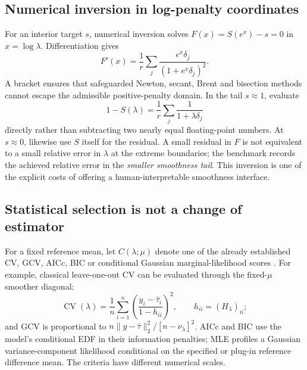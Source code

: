 \subsection{Numerical inversion in log-penalty coordinates}
For an interior target $s$, numerical inversion solves
$F(x)=S(e^x)-s=0$ in $x=\log\lambda$. Differentiation gives
\begin{equation}
F'(x)=\frac{1}{r}\sum_j
\frac{e^x\delta_j}{(1+e^x\delta_j)^2}.
\label{eq:expanded-log-derivative}
\end{equation}
A bracket ensures that safeguarded Newton, secant,
Brent and bisection methods cannot escape the admissible
positive-penalty domain. In the tail $s\approx1$, evaluate
\[
1-S(\lambda)=\frac1r\sum_j
\frac{1}{1+\lambda\delta_j}
\]
directly rather than subtracting two nearly equal
floating-point numbers. At $s\approx0$, likewise use $S$
itself for the residual. A small residual in $F$ is not
equivalent to a small relative error in $\lambda$ at the
extreme boundaries; the benchmark records the achieved
relative error in the \emph{smaller smoothness tail}.
This inversion is one of the explicit costs of offering
a human-interpretable smoothness interface.

\subsection{Statistical selection is not a change of estimator}
For a fixed reference mean, let $C(\lambda;\mu)$ denote
one of the already established CV, GCV, AICc, BIC
or conditional Gaussian marginal-likelihood scores
\cite{cortes2017smoothness}. For example, classical
leave-one-out CV can be evaluated through
the fixed-$\mu$ smoother diagonal:
\begin{equation}
\operatorname{CV}(\lambda)
=\frac1n\sum_{i=1}^{n}
\left(\frac{y_i-\widehat\tau_i}{1-h_{ii}}\right)^2,
\qquad h_{ii}=(H_\lambda)_{ii};
\label{eq:expanded-cv}
\end{equation}
and GCV is proportional to
$n\|y-\widehat\tau\|_2^2/[n-\nu_\lambda]^2$.
AICc and BIC use the model's conditional EDF in their
information penalties; MLE profiles a Gaussian
variance-component likelihood conditional on the
specified or plug-in reference difference mean.
The criteria have different numerical scales.

